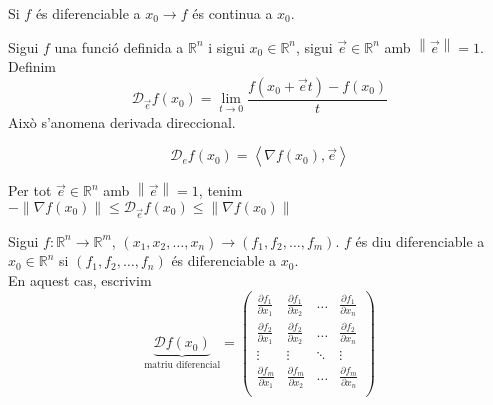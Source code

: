 \documentclass[../main.tex]{subfiles}
\begin{document}
    \begin{proposicio}
        Si $f$ és diferenciable a $x_0 \rightarrow f$ és continua a $x_0$.
    \end{proposicio}
    \begin{definicio}
        Sigui $f$ una funció definida a $\mathbb{R}^n$ i sigui $x_0 \in \mathbb{R}^n$,
        sigui $\vec{e} \in \mathbb{R}^n$ amb $\left\lVert \vec{e} \right\rVert = 1$. Definim
        \begin{displaymath}
            \mathcal{D}_{\vec{e}}f\left(x_0\right) = \lim\limits_{t\to0} \frac{f\left(x_0+\vec{e} t\right)-f\left(x_0\right)}{t}
        \end{displaymath}
        Això s'anomena derivada direccional. 
    \end{definicio}
    \begin{proposicio}
        \begin{displaymath}
            \mathcal{D}_ef\left(x_0\right) = \left\langle \nabla f \left(x_0\right), \vec{e}\right\rangle 
        \end{displaymath}
    \end{proposicio}
    \begin{corolari}
        Per tot $\vec{e} \in \mathbb{R}^n$ amb $\left\lVert \vec{e} \right\rVert = 1$, tenim $-\left\lVert \nabla f(x_0)\right\rVert \leq \mathcal{D}_{\vec{e}}f\left(x_0\right) \leq \left\lVert \nabla f(x_0)\right\rVert$ 
    \end{corolari}
    \begin{definicio}
        Sigui $f: \mathbb{R}^n \to \mathbb{R}^m$, $\left(x_1, x_2, \dots, x_n\right) \to \left(f_1, f_2, \dots, f_m\right)$.
        $f$ és diu diferenciable a $x_0 \in \mathbb{R}^n$ si $\left(f_1, f_2, \dots, f_n\right)$  és diferenciable a $x_0$.\\
        En aquest cas, escrivim
        \begin{displaymath}
            \underbrace{\mathcal{D}f\left(x_0\right)}_\text{matriu diferencial} =
            \begin{pmatrix}
                \frac{\partial f_1}{\partial x_1} & \frac{\partial f_1}{\partial x_2} & \dots & \frac{\partial f_1}{\partial x_n}\\
                \frac{\partial f_2}{\partial x_1} & \frac{\partial f_2}{\partial x_2} & \dots & \frac{\partial f_2}{\partial x_n}\\
                \vdots                            & \vdots                            & \ddots& \vdots\\
                \frac{\partial f_m}{\partial x_1} & \frac{\partial f_m}{\partial x_2} & \dots & \frac{\partial f_m}{\partial x_n}\\
            \end{pmatrix}
        \end{displaymath}
    \end{definicio}
\end{document}
